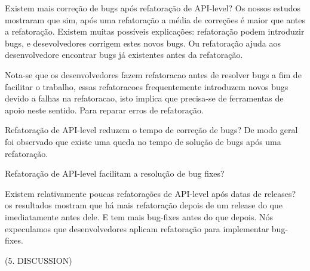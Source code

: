 \documentclass[12pt]{article}
\begin{document}
Existem mais correção de bugs após refatoração de API-level? Os nossos estudos mostraram que sim, após uma refatoração a média de correções é maior que antes a refatoração. Existem muitas possíveis explicações: refatoração podem introduzir bugs, e desevolvedores corrigem estes novos bugs. Ou refatoração ajuda aos desenvolvedore encontrar bugs já existentes antes da refatoração.

Nota-se que os desenvolvedores fazem refatoracao antes de resolver bugs a fim de facilitar o trabalho, essas refatoracoes frequentemente introduzem novos bugs devido a falhas na refatoracao, isto implica que precisa-se de ferramentas de apoio neste sentido. Para reparar erros de refatoração.

Refatoração de API-level reduzem o tempo de correção de bugs? De modo geral foi observado que existe uma queda no tempo de solução de bugs após uma refatoração.

Refatoração de API-level facilitam a resolução de bug fixes? 

Existem relativamente poucas refatorações de API-level após datas de releases? os resultados mostram que há mais refatoração depois de um release do que imediatamente antes dele. E tem mais bug-fixes antes do que depois. Nós expeculamos que desenvolvedores aplicam refatoração para implementar bug-fixes.

(5. DISCUSSION)



\end{document}
